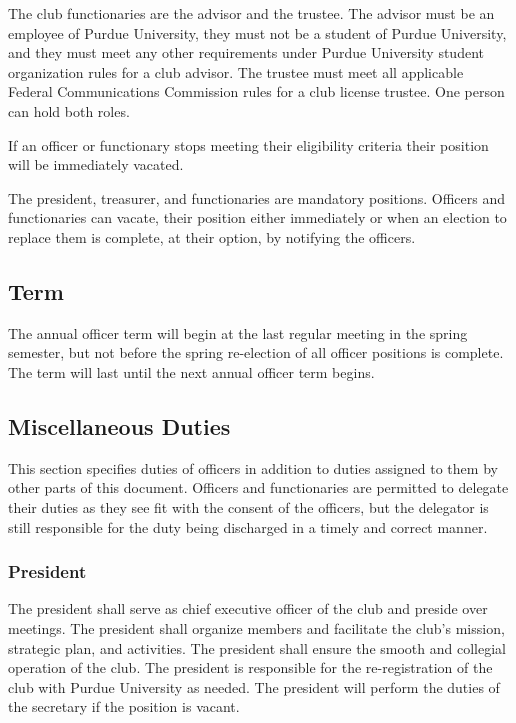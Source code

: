 \documentclass{article}
\begin{document}
The club functionaries are the advisor and the trustee. The advisor must be an
employee of Purdue University, they must not be a student of Purdue University,
and they must meet any other requirements under Purdue University student
organization rules for a club advisor. The trustee must meet all applicable
Federal Communications Commission rules for a club license trustee. One person
can hold both roles.

If an officer or functionary stops meeting their eligibility criteria their
position will be immediately vacated.

The president, treasurer, and functionaries are mandatory positions. Officers
and functionaries can vacate, their position either immediately or when an
election to replace them is complete, at their option, by notifying the
officers.

\subsection{Term}

The annual officer term will begin at the last regular meeting in the spring
semester, but not before the spring re-election of all officer positions is
complete. The term will last until the next annual officer term begins.

\subsection{Miscellaneous Duties}

This section specifies duties of officers in addition to duties assigned to them
by other parts of this document. Officers and functionaries are permitted to
delegate their duties as they see fit with the consent of the officers, but the
delegator is still responsible for the duty being discharged in a timely and
correct manner.

\subsubsection{President}

The president shall serve as chief executive officer of the club and preside
over meetings. The president shall organize members and facilitate the club's
mission, strategic plan, and activities. The president shall ensure the smooth
and collegial operation of the club. The president is responsible for the
re-registration of the club with Purdue University as needed. The president will
perform the duties of the secretary if the position is vacant.
\end{document}
